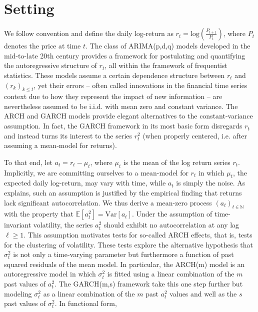 \documentclass[11pt]{article}
\def\mrm#1{\mathrm{#1}} %
\def\E{\mathbb{E}} %
\theoremstyle{definition}
\begin{document}
\section{Setting}
\label{section2}

We follow convention and define the daily log-return as $r_{t} = \text{log}(\frac{P_{t+1}}{P_{t}})$, where $P_{t}$ denotes the price at time $t$.  The class of ARIMA(p,d,q) models developed in the mid-to-late 20th century \citep{box2013box} provides a framework for postulating and quantifying the autoregressive structure of $r_{t}$, all within the framework of frequentist statistics.  These models assume a certain dependence structure between $r_{t}$ and $(r_{k})_{k\leq t}$, yet their errors -- often called innovations in the financial time series context due to how they represent the impact of new information -- are nevertheless assumed to be i.i.d. with mean zero and constant variance.  The ARCH \citep{engle1982autoregressive} and GARCH \citep{bollerslev1986generalized} models provide elegant alternatives to the constant-variance assumption.  In fact, the GARCH framework in its most basic form disregards $r_{t}$ and instead turns its interest to the series $r_{t}^{2}$ (when properly centered, i.e. after assuming a mean-model for returns).  

To that end, let $a_{t} = r_{t} - \mu_{t}$, where $\mu_{t}$ is the mean of the log return series $r_{t}$.  Implicitly, we are committing ourselves to a mean-model for $r_{t}$ in which $\mu_{t}$, the expected daily log-return, may vary with time, while $a_{t}$ is simply the noise.  As \citet{cont2001empirical} explains, such an assumption is justified by the empirical finding that returns lack significant autocorrelation.  We thus derive a mean-zero process $(a_{t})_{t\in\mathbb{N}}$ with the property that $\E[a^{2}_{t}] = \mrm{Var}[a_{t}]$.  Under the assumption of time-invariant volatility, the series $a_{t}^{2}$ should exhibit no autocorrelation at any lag $\ell\geq1$.  This assumption motivates tests for so-called ARCH effects, that is, tests for the clustering of volatility.  These tests explore the alternative hypothesis that $\sigma_{t}^{2}$ is not only a time-varying parameter but furthermore a function of past squared residuals of the mean model.  In particular, the ARCH(m) model is an autoregressive model in which $\sigma_{t}^{2}$ is fitted using a linear combination of the $m$ past values of $a_{t}^{2}$.  The GARCH(m,s) framework take this one step further but modeling $\sigma_{t}^{2}$ as a linear combination of the $m$ past $a_{t}^{2}$ values and well as the $s$ past values of $\sigma_{t}^{2}$.  In functional form,
\end{document}
